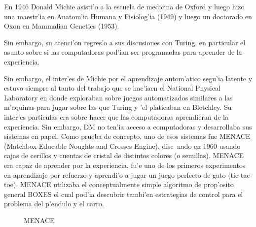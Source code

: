 \documentclass[11pt]{article}
\begin{document}
En 1946 Donald Michie asisti'o a la escuela de medicina de Oxford y luego hizo una maestr'ia en Anatom'ia Humana y Fisiolog'ia (1949) y luego un doctorado en Oxon en Mammalian Genetics (1953).

Sin embargo, su atenci'on regres'o a sus discusiones con Turing, en particular el asunto sobre si las computadoras pod'ian ser programadas para aprender de la experiencia.

Sin embargo, el inter'es de Michie por el aprendizaje autom'atico segu'ia latente y estuvo siempre al tanto del trabajo que se hac'iaen el National Physical Laboratory en donde exploraban sobre juegos automatizados similares a las m'aquinas para jugar sobre las que Turing y 'el platicaban en Bletchley. Su inter'es particulas era sobre hacer que las computadoras aprendieran de la experiencia. Sin embargo, DM no ten'ia acceso a computadoras y desarrollaba sus sistemas en papel. Como prueba de concepto, uno de esos sistemas fue MENACE (Matchbox Educable Noughts and Crosses Engine), dise~nado en 1960 usando cajas de cerillos y cuentas de cristal de distintos colores (o semillas). MENACE era capaz de aprender por la experiencia, fu'e uno de los primeros experimentos en aprendizaje por refuerzo y aprendi'o a jugar un juego perfecto de gato (tic-tac-toe). MENACE utilizaba el conceptualmente simple algoritmo de prop'osito general BOXES el cual pod'ia descubrir tambi'en estrategias de control para el problema del p'endulo y el carro.

\begin{figure}[h]

\centering
{}
\caption[MENACE]{MENACE} 
\label{fig:menace}

\end{figure}

\end{document}
